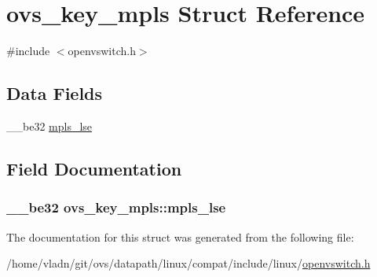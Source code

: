 \hypertarget{structovs__key__mpls}{}\section{ovs\+\_\+key\+\_\+mpls Struct Reference}
\label{structovs__key__mpls}


{\ttfamily \#include $<$openvswitch.\+h$>$}

\subsection*{Data Fields}
\begin{DoxyCompactItemize}
\item 
\+\_\+\+\_\+be32 \hyperlink{structovs__key__mpls_a44b32d5066667b5b1bf474b53a335fb1}{mpls\+\_\+lse}
\end{DoxyCompactItemize}


\subsection{Field Documentation}
\hypertarget{structovs__key__mpls_a44b32d5066667b5b1bf474b53a335fb1}{}
\subsubsection[{mpls\+\_\+lse}]{\setlength{\rightskip}{0pt plus 5cm}\+\_\+\+\_\+be32 ovs\+\_\+key\+\_\+mpls\+::mpls\+\_\+lse}\label{structovs__key__mpls_a44b32d5066667b5b1bf474b53a335fb1}


The documentation for this struct was generated from the following file\+:\begin{DoxyCompactItemize}
\item 
/home/vladn/git/ovs/datapath/linux/compat/include/linux/\hyperlink{openvswitch_8h}{openvswitch.\+h}\end{DoxyCompactItemize}

